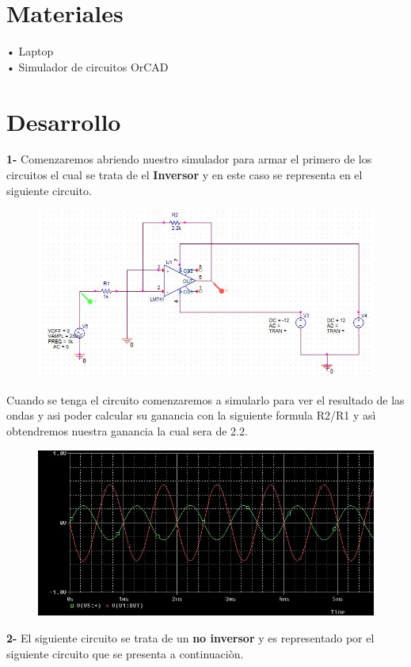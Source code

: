 \documentclass[12pt,a4paper]{article}
\begin{document}
\section{Materiales}
• Laptop\\• Simulador de circuitos OrCAD

\section{Desarrollo}
\textbf{1-} Comenzaremos abriendo nuestro simulador para armar el primero de los circuitos el cual se trata de el \textbf{Inversor} y en este caso se representa en el siguiente circuito.

\begin{figure}[h!]
\centering
\includegraphics[scale=1]{Inversor1.png} 
\end{figure}
\newpage
Cuando se tenga el circuito comenzaremos a simularlo para ver el resultado de las ondas y asi poder calcular su ganancia con la siguiente formula R2/R1 y asì obtendremos nuestra ganancia la cual sera de 2.2.

\begin{figure}[h!]
\centering
\includegraphics[scale=1]{Inversor2.png} 
\end{figure}
\newpage
\textbf{2-} El siguiente circuito se trata de un \textbf{no inversor} y es representado por el siguiente circuito que se presenta a continuaciòn.
\end{document}
